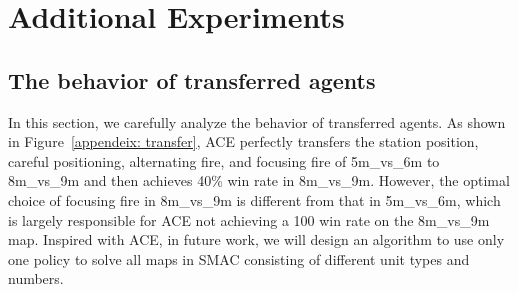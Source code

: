 \documentclass[letterpaper]{article} \usepackage{aaai23}  \usepackage{times}  \usepackage{helvet}  \usepackage{courier}  \usepackage[hyphens]{url}  \usepackage{graphicx} \urlstyle{rm} \def\UrlFont{\rm}  \usepackage{natbib}  \usepackage{caption} \frenchspacing  \setlength{\pdfpagewidth}{8.5in} \setlength{\pdfpageheight}{11in} \usepackage{algorithm}
\begin{document}
\section{Additional Experiments}
\label{sec: add_exp}
\subsection{The behavior of transferred agents}
In this section, we carefully analyze the behavior of transferred agents. As shown in Figure~\ref{appendeix: transfer},  ACE perfectly transfers the station position, careful positioning, alternating fire, and focusing fire of 5m\_vs\_6m to 8m\_vs\_9m and then achieves 40\% win rate in 8m\_vs\_9m. However, the optimal choice of focusing fire in 8m\_vs\_9m is different from that in 5m\_vs\_6m, which is largely responsible for ACE not achieving a 100 win rate on the 8m\_vs\_9m map.
Inspired with ACE, in future work, we will design an algorithm to use only one policy to solve all maps in SMAC consisting of different unit types and numbers.
\end{document}
